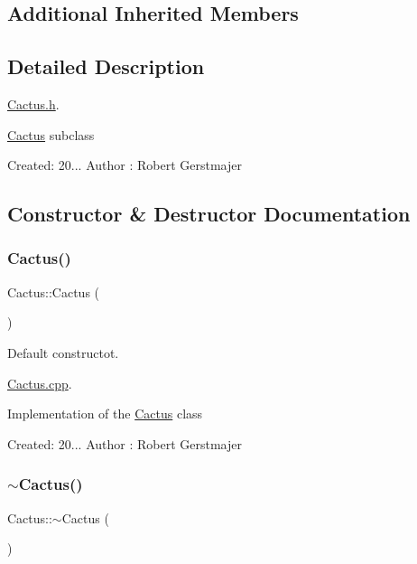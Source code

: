 \subsection*{Additional Inherited Members}


\subsection{Detailed Description}
\mbox{\hyperlink{_cactus_8h}{Cactus.\+h}}. 

\mbox{\hyperlink{class_cactus}{Cactus}} subclass

Created\+: 20... Author \+: Robert Gerstmajer 

\subsection{Constructor \& Destructor Documentation}
\mbox{\label{class_cactus_a7af2b09f8e3efd82ee3d5dc1b5ad24d7}} 
\subsubsection{\texorpdfstring{Cactus()}{Cactus()}}
{\footnotesize\ttfamily Cactus\+::\+Cactus (\begin{DoxyParamCaption}{ }\end{DoxyParamCaption})}



Default constructot. 

\mbox{\hyperlink{_cactus_8cpp}{Cactus.\+cpp}}.

Implementation of the \mbox{\hyperlink{class_cactus}{Cactus}} class

Created\+: 20... Author \+: Robert Gerstmajer \mbox{\label{class_cactus_aad137061a9d2432ac47f4c28b23644c3}} 
\subsubsection{\texorpdfstring{$\sim$\+Cactus()}{~Cactus()}}
{\footnotesize\ttfamily Cactus\+::$\sim$\+Cactus (\begin{DoxyParamCaption}{ }\end{DoxyParamCaption})}



